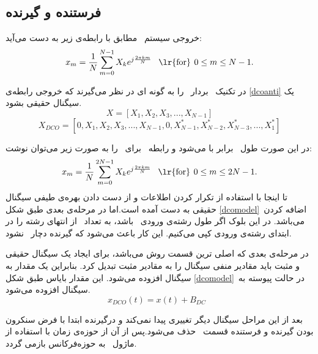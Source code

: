 \documentclass{article}
\begin{document}
\subsection{فرستنده و گیرنده}
خروجی سیستم \ مطابق با رابطه‌ی زیر به دست می‌آید:
\begin{equation}
x_{m} = \frac{1}{N}\sum_{m=0}^{N-1}X_{k}e^{j \frac{2 \pi km}{N}}    \hspace{8pt}\textrm{\lr{for}}  \hspace{4pt}  0 \leq m \leq N-1 .
\label{dcoanti}
\end{equation}

در تکنیک \ بردار \ را به گونه ای در نظر می‌گیرند که خروجی رابطه‌ی  \ref{dcoanti} یک سیگنال حقیقی بشود.
\begin{equation}
X=[X_{1},X_{2},X_{3},...,X_{N-1}]
\label{ofdmseq}
\end{equation}
\begin{equation}
X_{DCO}=[0,X_{1},X_{2},X_{3},...,X_{N-1},0,X_{N-1}^{*},X_{N-2}^{*},X_{N-3}^{*},...,X_{1}^{*}]
\label{dcoseq}
\end{equation}

در این صورت طول \ برابر با  می‌شود و رابطه‌ \ برای \ را به صورت زیر می‌توان نوشت:
\begin{equation}
x_{m} = \frac{1}{N}\sum_{m=0}^{2N-1}X_{k}e^{j \frac{2 \pi km}{N}}    \hspace{8pt}\textrm{\lr{for}}  \hspace{4pt}  0 \leq m \leq 2N-1 .
\label{dcoifft}
\end{equation}
تا اینجا با استفاده از تکرار کردن اطلاعات و از دست دادن بهره‌ی طیفی سیگنال حقیقی به دست آمده است.اما در مرحله‌ی بعدی طبق شکل \ref{dcomodel}\ اضافه کردن  \ می‌باشد. در این بلوک اگر طول رشته‌ی ورودی \ باشد، به تعداد \ از انتهای رشته را در ابتدای رشته‌ی ورودی کپی می‌کنیم. این کار باعث می‌شود که گیرنده دچار  \ نشود.

در مرحله‌ی بعدی که اصلی ترین قسمت روش  می‌باشد، برای ایجاد یک سیگنال حقیقی و مثبت باید مقادیر منفی سیگنال را به مقادیر مثبت تبدیل کرد. بنابراین یک مقدار  به سیگنال افزوده می‌شود. این مقدار بایاس طبق شکل \ref{dcomodel}\ در حالت پیوسته به سیگنال افزوده می‌شود.
\begin{equation}
x_{DCO}(t)=x(t)+B_{DC} \hspace{8pt}
\label{dcox}
\end{equation}

بعد از این مراحل سیگنال دیگر تغییری پیدا نمی‌کند و درگیرنده ابتدا با فرض سنکرون بودن گیرنده و فرستنده قسمت \ حذف می‌شود.پس از آن از حوزه‌ی زمان با استفاده از ماژول \ به حوزه‌فرکانس بازمی گردد.
\end{document}
